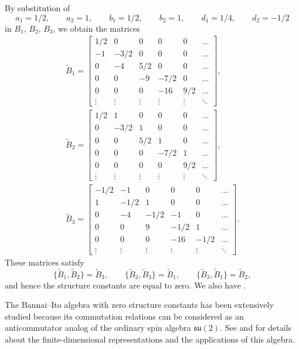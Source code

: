 \documentclass[pdftex]{sigma}
\numberwithin{equation}{section}
\begin{document}
By substitution of
		\[ a_1=1/2,\qquad a_2=1,\qquad b_1=1/2,\qquad b_2=1,\qquad d_1=1/4,\qquad d_2=-1/2 \]
in $B_1$, $B_2$, $B_3$, we obtain the matrices
	\begin{gather*}%
		\tilde{B}_1= \begin{bmatrix} 1/2 & 0 & 0 & 0 & 0 & \dots \\
			-1  & -3/2 & 0 & 0 & 0 & \dots \\
			0 & -4  & 5/2  & 0 & 0  & \dots \\
			0 & 0 & -9  & -7/2 & 0 & \dots \\
      0 & 0 & 0  & -16  & 9/2 & \dots \\
		\vdots  & \vdots  & \vdots  & \vdots & \vdots  &  \ddots  \end{bmatrix},
\\%
	\tilde{B}_2 = \begin{bmatrix} 1/2 & 1 & 0 & 0 & 0 & \dots \\
			0 & -3/2 & 1 & 0 & 0 & \dots \\
			0 & 0  & 5/2  & 1 &0 & \dots \\
			0 & 0 & 0 & -7/2 & 1 & \dots \\
      0 & 0 & 0  & 0  & 9/2  & \dots \\
		\vdots  & \vdots  & \vdots  & \vdots  & \vdots  & \ddots  \end{bmatrix},
\\%
		\tilde{B}_3 = \begin{bmatrix} -1/2 & -1 & 0 & 0 & 0 & \dots \\
			1 & -1/2 & 1 & 0 & 0 & \dots \\
			0 & -4 & -1/2  & -1 &0 & \dots \\
			0 & 0 & 9 & -1/2 & 1 & \dots \\
      0 & 0 & 0  & -16  & -1/2  & \dots \\
		\vdots  & \vdots  & \vdots  & \vdots  & \vdots  & \ddots  \end{bmatrix}.
\end{gather*}
These matrices satisfy
\[ \bigl\{\tilde{B}_1, \tilde{B}_2\bigr\}= \tilde{B}_3,\qquad \bigl\{\tilde{B}_2, \tilde{B}_3\bigr\}= \tilde{B}_1, \qquad \bigl\{\tilde{B}_3, \tilde{B}_1\bigr\}= \tilde{B}_2, \]
			and hence the structure constants are equal to zero. We also have .

The Bannai--Ito algebra with zero structure constants has been extensively studied because its commutation relations can be considered as an anticommutator analog of the ordinary spin algebra $\mathfrak{su}(2)$.
See \cite{Brown} and \cite{GVYZ} for details about the finite-dimensional representations and the applications of this algebra.
			
\end{document}
